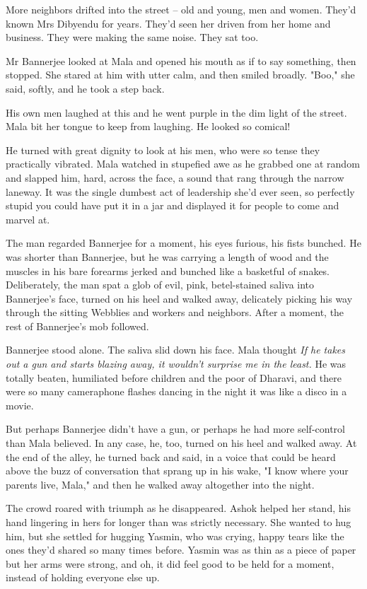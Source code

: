 More neighbors drifted into the street -- old and young, men and
women. They'd known Mrs Dibyendu for years. They'd seen her driven
from her home and business. They were making the same noise. They
sat too.

Mr Bannerjee looked at Mala and opened his mouth as if to say
something, then stopped. She stared at him with utter calm, and
then smiled broadly. "Boo," she said, softly, and he took a step
back.

His own men laughed at this and he went purple in the dim light of
the street. Mala bit her tongue to keep from laughing. He looked so
comical!

He turned with great dignity to look at his men, who were so tense
they practically vibrated. Mala watched in stupefied awe as he
grabbed one at random and slapped him, hard, across the face, a
sound that rang through the narrow laneway. It was the single
dumbest act of leadership she'd ever seen, so perfectly stupid you
could have put it in a jar and displayed it for people to come and
marvel at.

The man regarded Bannerjee for a moment, his eyes furious, his
fists bunched. He was shorter than Bannerjee, but he was carrying a
length of wood and the muscles in his bare forearms jerked and
bunched like a basketful of snakes. Deliberately, the man spat a
glob of evil, pink, betel-stained saliva into Bannerjee's face,
turned on his heel and walked away, delicately picking his way
through the sitting Webblies and workers and neighbors. After a
moment, the rest of Bannerjee's mob followed.

Bannerjee stood alone. The saliva slid down his face. Mala thought
\emph{If he takes out a gun and starts blazing away, it wouldn't surprise me in the least.}
He was totally beaten, humiliated before children and the poor of
Dharavi, and there were so many cameraphone flashes dancing in the
night it was like a disco in a movie.

But perhaps Bannerjee didn't have a gun, or perhaps he had more
self-control than Mala believed. In any case, he, too, turned on
his heel and walked away. At the end of the alley, he turned back
and said, in a voice that could be heard above the buzz of
conversation that sprang up in his wake, "I know where your parents
live, Mala," and then he walked away altogether into the night.

The crowd roared with triumph as he disappeared. Ashok helped her
stand, his hand lingering in hers for longer than was strictly
necessary. She wanted to hug him, but she settled for hugging
Yasmin, who was crying, happy tears like the ones they'd shared so
many times before. Yasmin was as thin as a piece of paper but her
arms were strong, and oh, it did feel good to be held for a moment,
instead of holding everyone else up.


